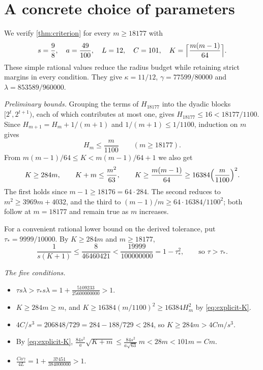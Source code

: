 \documentclass[11pt]{amsart}
\numberwithin{equation}{section}
\theoremstyle{definition}
\theoremstyle{remark}
\newcommand{\cond}[1]{\textup{(C#1)}}
\begin{document}
\section{A concrete choice of parameters}\label{sec:explicit}

We verify \cref{thm:criterion} for every $m\ge18177$ with
\begin{equation}\label{eq:explicit-parameters}
 s=\frac98,\quad a=\frac{49}{100},\quad L=12,\quad
 C=101,\quad
 K=\Bigl\lceil\frac{m(m-1)}{64}\Bigr\rceil.
\end{equation}
These simple rational values reduce the radius budget while retaining
strict margins in every condition. They give $\kappa=11/12$,
$\gamma=77599/80000$ and $\lambda=853589/960000$.

\emph{Preliminary bounds.} Grouping the terms of $H_{18177}$ into the
dyadic blocks $[2^t,2^{t+1})$, each of which contributes at most one,
gives $H_{18177}\le16<18177/1100$. Since $H_{m+1}=H_m+1/(m+1)$ and
$1/(m+1)\le1/1100$,
induction on $m$ gives
\[
 H_m\le\frac m{1100}\qquad(m\ge18177).
\]
From $m(m-1)/64\le K<m(m-1)/64+1$ we also get
\begin{equation}\label{eq:explicit-K}
 K\ge284m,\qquad K+m\le\frac{m^2}{63},\qquad
 K\ge\frac{m(m-1)}{64}\ge16384\Bigl(\frac m{1100}\Bigr)^2.
\end{equation}
The first holds since $m-1\ge18176=64\cdot284$. The second reduces to
$m^2\ge3969m+4032$, and the third to
$(m-1)/m\ge64\cdot16384/1100^2$; both follow at $m=18177$ and remain
true as $m$ increases.

For a convenient rational lower bound on the derived tolerance, put
$\tau_*=9999/10000$. By $K\ge284m$ and $m\ge18177$,
\[
 \frac1{s(K+1)}\le\frac8{46460421}
 <\frac{19999}{100000000}=1-\tau_*^2,
 \qquad\text{so }\tau>\tau_*.
\]

\emph{The five conditions.}
\begin{itemize}[leftmargin=2em,itemsep=2pt]
\item[\cond1] $\tau s\lambda>\tau_*s\lambda
 =1+\frac{5109233}{25600000000}>1$.
\item[\cond2] $K\ge284m\ge m$, and
 $K\ge16384(m/1100)^2\ge16384H_m^2$ by \eqref{eq:explicit-K}.
\item[\cond3] $4C/s^3=206848/729=284-188/729<284$, so
 $K\ge284m>4Cm/s^3$.
\item[\cond4] By \eqref{eq:explicit-K},
 $\frac{84s^2}{a}\sqrt{K+m}\le\frac{84s^2}{a\sqrt{63}}\,m<28m<101m=Cm$.
\item[\cond5] $\frac{Ca\gamma}{4L}
 =1+\frac{37451}{384000000}>1$.
\end{itemize}
\end{document}
